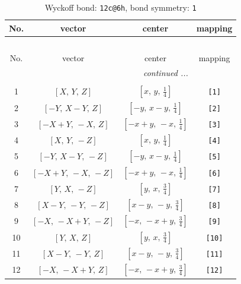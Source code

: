 \documentclass[fleqn,8pt]{jsarticle}
\begin{document}
\begin{longtable}{cccc}
\caption{Wyckoff bond: {\tt 12c@6h}, bond symmetry: {\tt 1}}
 \\
 \hline \hline
No. & vector & center & mapping \\ \hline \endfirsthead

\multicolumn{3}{l}{\tablename\ \thetable{}} \\
 \hline \hline
No. & vector & center & mapping \\ \hline \endhead

 \hline \hline
\multicolumn{3}{r}{\footnotesize\it continued ...} \\ \endfoot

 \hline \hline
\multicolumn{3}{r}{} \\ \endlastfoot

1 & $\left[ X,\, Y,\, Z \right]$ & $\left[ x,\, y,\, \frac{1}{4} \right]$ & {\tt [1]} \\ \hline
2 & $\left[ - Y,\, X - Y,\, Z \right]$ & $\left[ - y,\, x - y,\, \frac{1}{4} \right]$ & {\tt [2]} \\ \hline
3 & $\left[ - X + Y,\, - X,\, Z \right]$ & $\left[ - x + y,\, - x,\, \frac{1}{4} \right]$ & {\tt [3]} \\ \hline
4 & $\left[ X,\, Y,\, - Z \right]$ & $\left[ x,\, y,\, \frac{1}{4} \right]$ & {\tt [4]} \\ \hline
5 & $\left[ - Y,\, X - Y,\, - Z \right]$ & $\left[ - y,\, x - y,\, \frac{1}{4} \right]$ & {\tt [5]} \\ \hline
6 & $\left[ - X + Y,\, - X,\, - Z \right]$ & $\left[ - x + y,\, - x,\, \frac{1}{4} \right]$ & {\tt [6]} \\ \hline
7 & $\left[ Y,\, X,\, - Z \right]$ & $\left[ y,\, x,\, \frac{3}{4} \right]$ & {\tt [7]} \\ \hline
8 & $\left[ X - Y,\, - Y,\, - Z \right]$ & $\left[ x - y,\, - y,\, \frac{3}{4} \right]$ & {\tt [8]} \\ \hline
9 & $\left[ - X,\, - X + Y,\, - Z \right]$ & $\left[ - x,\, - x + y,\, \frac{3}{4} \right]$ & {\tt [9]} \\ \hline
10 & $\left[ Y,\, X,\, Z \right]$ & $\left[ y,\, x,\, \frac{3}{4} \right]$ & {\tt [10]} \\ \hline
11 & $\left[ X - Y,\, - Y,\, Z \right]$ & $\left[ x - y,\, - y,\, \frac{3}{4} \right]$ & {\tt [11]} \\ \hline
12 & $\left[ - X,\, - X + Y,\, Z \right]$ & $\left[ - x,\, - x + y,\, \frac{3}{4} \right]$ & {\tt [12]} \\
\end{longtable}
\end{document}

